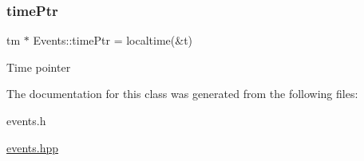 \subsubsection{\texorpdfstring{time\+Ptr}{timePtr}}
{\footnotesize\ttfamily tm $\ast$ Events\+::time\+Ptr = localtime(\&t)\hspace{0.3cm}{\ttfamily [static]}}

Time pointer 

The documentation for this class was generated from the following files\+:\begin{DoxyCompactItemize}
\item 
events.\+h\item 
\hyperlink{events_8hpp}{events.\+hpp}\end{DoxyCompactItemize}
